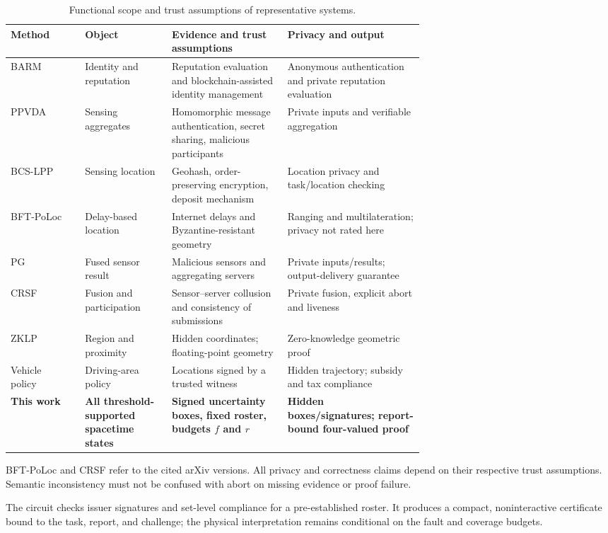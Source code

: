 \begin{table}[htbp]\centering\footnotesize
\caption{Functional scope and trust assumptions of representative systems.}\label{tab:related-work}
\begin{tabularx}{\linewidth}{@{}p{0.18\linewidth}p{0.21\linewidth}p{0.29\linewidth}X@{}}
\toprule Method & Object & Evidence and trust assumptions & Privacy and output\\\midrule
BARM~\citep{Zheng2025BARM} & Identity and reputation & Reputation evaluation and blockchain-assisted identity management & Anonymous authentication and private reputation evaluation\\
PPVDA~\citep{Zhou2024} & Sensing aggregates & Homomorphic message authentication, secret sharing, malicious participants & Private inputs and verifiable aggregation\\
BCS-LPP~\citep{Shen2024} & Sensing location & Geohash, order-preserving encryption, deposit mechanism & Location privacy and task/location checking\\
BFT-PoLoc~\citep{BFTPoLoc} & Delay-based location & Internet delays and Byzantine-resistant geometry & Ranging and multilateration; privacy not rated here\\
PG~\citep{PG} & Fused sensor result & Malicious sensors and aggregating servers & Private inputs/results; output-delivery guarantee\\
CRSF~\citep{CRSF} & Fusion and participation & Sensor--server collusion and consistency of submissions & Private fusion, explicit abort and liveness\\
ZKLP~\citep{ZKLP} & Region and proximity & Hidden coordinates; floating-point geometry & Zero-knowledge geometric proof\\
Vehicle policy~\citep{VehiclePolicy} & Driving-area policy & Locations signed by a trusted witness & Hidden trajectory; subsidy and tax compliance\\
\textbf{This work} & \textbf{All threshold-supported spacetime states} & \textbf{Signed uncertainty boxes, fixed roster, budgets $f$ and $r$} & \textbf{Hidden boxes/signatures; report-bound four-valued proof}\\\bottomrule
\end{tabularx}
\par\smallskip\raggedright\footnotesize BFT-PoLoc and CRSF refer to the cited arXiv versions. All privacy and correctness claims depend on their respective trust assumptions. Semantic inconsistency must not be confused with abort on missing evidence or proof failure.
\end{table}

The circuit checks issuer signatures and set-level compliance for a pre-established roster. It produces a compact, noninteractive certificate bound to the task, report, and challenge; the physical interpretation remains conditional on the fault and coverage budgets.

